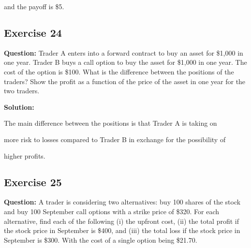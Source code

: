 \documentclass{article}
\begin{document}
and the payoff is \$5.

\subsection*{Exercise 24}

\textbf{Question:} Trader A enters into a forward contract to buy an asset for \$1,000 in one year. Trader B buys a
call option to buy the asset for \$1,000 in one year. The cost of the option is \$100. What is the difference between the positions of the traders? Show the profit as a function of the price of the asset in one year for the two traders.

\textbf{Solution:} 


The main difference between the positions is that Trader A is taking on 

more risk to losses compared to Trader B in exchange for the possibility of 

higher profits.

\subsection*{Exercise 25}

\textbf{Question:} A trader is considering two alternatives: buy 100 shares of
the stock and buy 100 September call options with a strike price of \$320. For each alternative, find each of the
following (i) the upfront cost, (ii) the total profit if the stock price in September is \$400, and (iii) the total loss if the stock price in September is \$300. With the cost of a single option being \$21.70.
\end{document}
